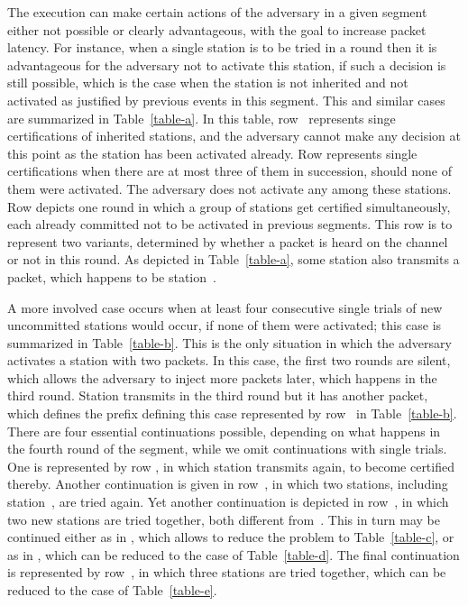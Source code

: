 \documentclass[11pt]{article}
\begin{document}
The execution can make certain actions of the adversary in a given segment either not possible or clearly advantageous, with the goal to increase packet latency.
For instance, when a single station is to be tried in a round then it is advantageous for the adversary not to activate this station, if such a decision is still possible, which is the case when the station is not inherited and not activated as justified by previous events in this segment.
This and similar cases are summarized in Table~\ref{table-a}.
In this table, row~ represents singe certifications of inherited stations, and the adversary cannot make any decision at this point as the station has been activated already. 
Row  represents single certifications when there are at most three of them in succession, should none of them were activated.
The adversary does not activate any among these stations.
Row  depicts one round in which a group of stations get certified simultaneously, each already committed not to be activated in previous segments.
This row is to represent two variants, determined by whether a packet is heard on the channel or not in this round.
As depicted in Table~\ref{table-a}, some station also transmits a packet, which happens to be station~.

A more involved case occurs when at least four consecutive single trials of new uncommitted stations would occur, if none of them were activated; this case is summarized in Table~\ref{table-b}.
This is the only situation in which the adversary activates a station with two packets.
In this case, the first two rounds are silent, which allows the adversary to inject more packets later, which happens in the third round.
Station  transmits in the third round but it has another packet, which defines the prefix defining this case represented by row~ in Table~\ref{table-b}.
There are four essential continuations possible, depending on what happens in the fourth round of the segment, while we omit continuations with single trials.
One is represented by row , in which station  transmits again, to become certified thereby.
Another continuation is given in row~, in which two stations, including station~, are tried again.
Yet another continuation is depicted in row~, in which two new stations are tried together, both different from~.
This in turn may be continued either as in , which allows to reduce the problem to Table~\ref{table-c},  or as in , which can be reduced to the case of Table~\ref{table-d}.
The final continuation is represented by row~, in which three stations are tried together, which can be reduced to the case of Table~\ref{table-e}.
\end{document}
